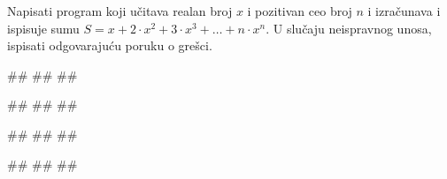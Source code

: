 \begin{Exercise}[label=PET_40]
 Napisati program koji učitava realan broj $x$ i pozitivan ceo broj $n$ i 
 izračunava i ispisuje sumu $S=x+2\cdot x^2+3\cdot
 x^3+\ldots+n\cdot x^n$.
 U slučaju neispravnog unosa, ispisati odgovarajuću poruku o grešci.
 
\begin{miditest}
\begin{upotreba}{1}
#\naslovInt#
##
##
\end{upotreba}
\end{miditest}
\begin{miditest}
\begin{upotreba}{2}
#\naslovInt#
##
##
\end{upotreba}
\end{miditest}

\begin{miditest}
\begin{upotreba}{3}
#\naslovInt#
##
##
\end{upotreba}
\end{miditest}
\begin{miditest}
\begin{upotreba}{4}
#\naslovInt#
##
##
\end{upotreba}
\end{miditest}

\end{Exercise}
\ifresenja
\begin{Answer}[ref=PET_40]
\end{Answer}
\fi


